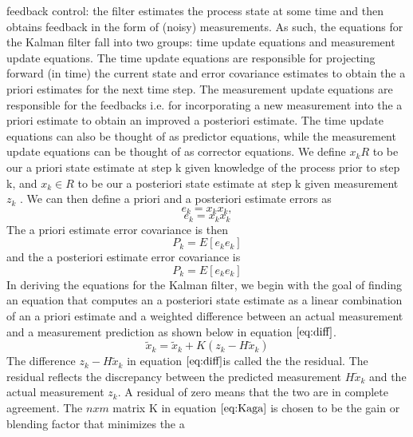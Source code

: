 \documentclass[a4paper,8pt]{report}
\begin{document}
feedback control: the filter estimates the process state at some
time and then obtains feedback in the form of (noisy) measurements.
As such, the equations for the Kalman filter fall into two groups:
time update equations and measurement update equations. The time
update equations are responsible for projecting forward (in time)
the current state and error covariance estimates to obtain the a
priori estimates for the next time step. The measurement update
equations are responsible for the feedbacks i.e. for incorporating a
new measurement into the a priori estimate to obtain an improved a
posteriori estimate. The time update equations can also be thought
of as predictor equations, while the measurement update equations
can be thought of as corrector equations.
\newline
We define $x_k  R$ to be our a priori state estimate at step k given
knowledge of the process prior to step k, and $x_k ∈ R$ to be our
a posteriori state estimate at step k given measurement $z_k$ . We
can then define a priori and a posteriori estimate errors as
\begin{equation}
e_k = x_k  x_k ,
\end{equation}
\begin{equation}
e_k = x_k  x_k
\end{equation}
The a priori estimate error covariance is then
\begin{equation}
P_k = E[ e_k e_k ]
\end{equation}
and the a posteriori estimate error covariance is
\begin{equation}
P_k = E[e_k e_k]
\end{equation}
In deriving the equations for the Kalman filter, we begin with the goal of finding
an equation that computes an a posteriori state estimate as a linear
combination of an a priori estimate and a weighted difference
between an actual measurement and a measurement prediction as shown
below in equation $\ref{eq:diff}$.
\begin{equation}
\tilde x_k = \tilde x_k + K(z_k-H\tilde x_k) \label{diff}
\end{equation} The
difference $z_k - H\tilde x_k$ in equation $\ref{eq:diff}$is called
the the residual. The residual reflects the discrepancy between the
predicted measurement $H\tilde x_k$ and the actual measurement
$z_k$. A residual of zero means that the two are in complete
agreement. \newline The $nxm$ matrix K in equation $\ref{eq:Kaga}$
is chosen to be the gain or blending factor that minimizes the a
\end{document}
